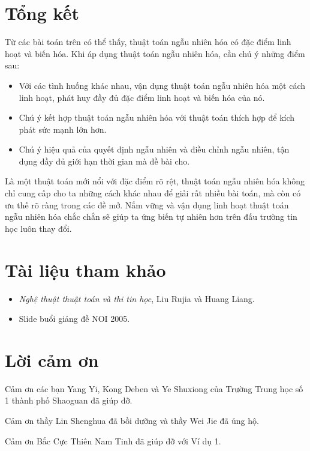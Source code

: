 \documentclass[11pt]{article}
\begin{document}
\section*{Tổng kết}

Từ các bài toán trên có thể thấy, thuật toán ngẫu nhiên hóa có đặc điểm linh
hoạt và biến hóa. Khi áp dụng thuật toán ngẫu nhiên hóa, cần chú ý những điểm
sau:

\begin{itemize}
  \item Với các tình huống khác nhau, vận dụng thuật toán ngẫu nhiên hóa một
  cách linh hoạt, phát huy đầy đủ đặc điểm linh hoạt và biến hóa của nó.
  \item Chú ý kết hợp thuật toán ngẫu nhiên hóa với thuật toán thích hợp để
  kích phát sức mạnh lớn hơn.
  \item Chú ý hiệu quả của quyết định ngẫu nhiên và điều chỉnh ngẫu nhiên,
  tận dụng đầy đủ giới hạn thời gian mà đề bài cho.
\end{itemize}

Là một thuật toán mới nổi với đặc điểm rõ rệt, thuật toán ngẫu nhiên hóa không
chỉ cung cấp cho ta những cách khác nhau để giải rất nhiều bài toán, mà còn
có ưu thế rõ ràng trong các đề mở. Nắm vững và vận dụng linh hoạt thuật toán
ngẫu nhiên hóa chắc chắn sẽ giúp ta ứng biến tự nhiên hơn trên đấu trường tin
học luôn thay đổi.

\section*{Tài liệu tham khảo}

\begin{itemize}
  \item \textit{Nghệ thuật thuật toán và thi tin học}, Liu Rujia và Huang
  Liang.
  \item Slide buổi giảng đề NOI 2005.
\end{itemize}

\section*{Lời cảm ơn}

Cảm ơn các bạn Yang Yi, Kong Deben và Ye Shuxiong của Trường Trung học số 1
thành phố Shaoguan đã giúp đỡ.

Cảm ơn thầy Lin Shenghua đã bồi dưỡng và thầy Wei Jie đã ủng hộ.

Cảm ơn Bắc Cực Thiên Nam Tinh đã giúp đỡ với Ví dụ 1.
\end{document}
